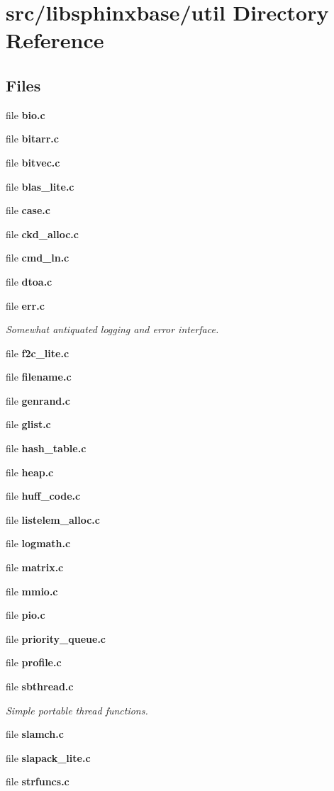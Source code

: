 \section{src/libsphinxbase/util Directory Reference}
\label{dir_dc1f04dceb148346198172cb52290701}
\subsection*{Files}
\begin{DoxyCompactItemize}
\item 
file {\bfseries bio.\-c}
\item 
file {\bfseries bitarr.\-c}
\item 
file {\bfseries bitvec.\-c}
\item 
file {\bfseries blas\-\_\-lite.\-c}
\item 
file {\bfseries case.\-c}
\item 
file {\bfseries ckd\-\_\-alloc.\-c}
\item 
file {\bfseries cmd\-\_\-ln.\-c}
\item 
file {\bfseries dtoa.\-c}
\item 
file {\bf err.\-c}
\begin{DoxyCompactList}\small\item\em Somewhat antiquated logging and error interface. \end{DoxyCompactList}\item 
file {\bfseries f2c\-\_\-lite.\-c}
\item 
file {\bfseries filename.\-c}
\item 
file {\bfseries genrand.\-c}
\item 
file {\bfseries glist.\-c}
\item 
file {\bfseries hash\-\_\-table.\-c}
\item 
file {\bfseries heap.\-c}
\item 
file {\bfseries huff\-\_\-code.\-c}
\item 
file {\bfseries listelem\-\_\-alloc.\-c}
\item 
file {\bfseries logmath.\-c}
\item 
file {\bfseries matrix.\-c}
\item 
file {\bfseries mmio.\-c}
\item 
file {\bfseries pio.\-c}
\item 
file {\bfseries priority\-\_\-queue.\-c}
\item 
file {\bfseries profile.\-c}
\item 
file {\bf sbthread.\-c}
\begin{DoxyCompactList}\small\item\em Simple portable thread functions. \end{DoxyCompactList}\item 
file {\bfseries slamch.\-c}
\item 
file {\bfseries slapack\-\_\-lite.\-c}
\item 
file {\bfseries strfuncs.\-c}
\end{DoxyCompactItemize}
